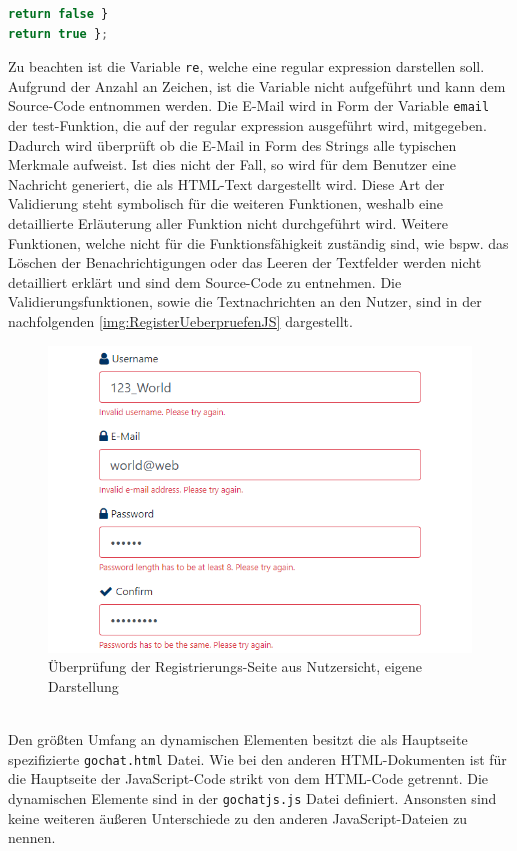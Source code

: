 \documentclass[a4paper,titlepage,halfparskip,12pt]{scrreprt}
\begin{document}
\begin{onehalfspacing}
\begin{lstlisting}[language=Javascript,caption=Validierungsfunktion \textit{validateEmail()},label={lst:RegisterValidateFunction}]
return false }
return true };
\end{lstlisting}
Zu beachten ist die Variable \texttt{re}, welche eine regular expression darstellen soll. Aufgrund der Anzahl an Zeichen, ist die Variable nicht aufgeführt und kann dem Source-Code entnommen werden. Die E-Mail wird in Form der Variable \texttt{email} der test-Funktion, die auf der regular expression ausgeführt wird, mitgegeben. Dadurch wird überprüft ob die E-Mail in Form des Strings alle typischen Merkmale aufweist. Ist dies nicht der Fall, so wird für dem Benutzer eine Nachricht generiert, die als \ac{HTML}-Text dargestellt wird. Diese Art der Validierung steht symbolisch für die weiteren Funktionen, weshalb eine detaillierte Erläuterung aller Funktion nicht durchgeführt wird. Weitere Funktionen, welche nicht für die Funktionsfähigkeit zuständig sind, wie bspw. das Löschen der Benachrichtigungen oder das Leeren der Textfelder werden nicht detailliert erklärt und sind dem Source-Code zu entnehmen. Die Validierungsfunktionen, sowie die Textnachrichten an den Nutzer, sind in der nachfolgenden \autoref{img:RegisterUeberpruefenJS} dargestellt.
\begin{figure}[h]
	\centering
	\includegraphics[scale=0.8]{images/RegisterUeberpruefenJS}
	\caption{Überprüfung der Registrierungs-Seite aus Nutzersicht, eigene Darstellung}
	\label{img:RegisterUeberpruefenJS}
\end{figure}\\
Den größten Umfang an dynamischen Elementen besitzt die als Hauptseite spezifizierte \texttt{gochat.html} Datei. Wie bei den anderen HTML-Dokumenten ist für die Hauptseite der JavaScript-Code strikt von dem HTML-Code getrennt. Die dynamischen Elemente sind in der \texttt{gochatjs.js} Datei definiert. Ansonsten sind keine weiteren äußeren Unterschiede zu den anderen JavaScript-Dateien zu nennen. 

\end{onehalfspacing}
\end{document}

